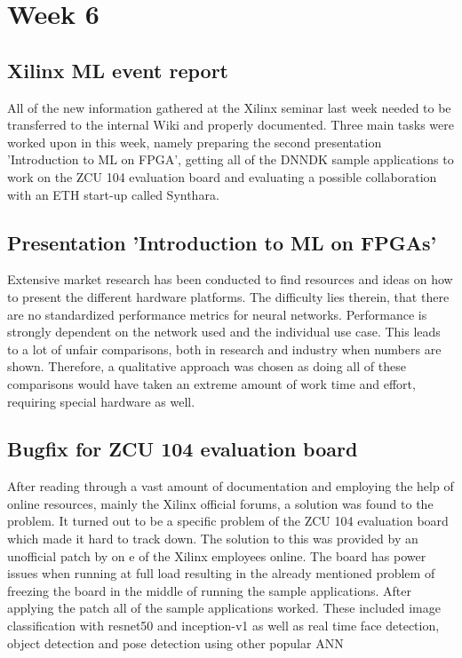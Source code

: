\section{Week 6}
\subsection{Xilinx \acs{ML} event report}
All of the new information gathered at the Xilinx seminar last week needed to be transferred to the internal Wiki and properly documented. 
Three main tasks were worked upon in this week, namely preparing the second presentation 'Introduction to \ac{ML} on \ac{FPGA}', getting all of the \ac{DNNDK} sample applications to work on the ZCU 104 evaluation board and evaluating a possible collaboration with an ETH start-up called Synthara.
\subsection{Presentation 'Introduction to \ac{ML} on \acp{FPGA}'}
Extensive market research has been conducted to find resources and ideas on how to present the different hardware platforms. The difficulty lies therein, that there are no standardized performance metrics for neural networks. Performance is strongly dependent on the network used and the individual use case. This leads to a lot of unfair comparisons, both in research and industry when numbers are shown. Therefore, a qualitative approach was chosen as doing all of these comparisons would have taken an extreme amount of work time and effort, requiring special hardware as well.
\subsection{Bugfix for ZCU 104 evaluation board}
After reading through a vast amount of documentation and employing the help of online resources, mainly the Xilinx official forums, a solution was found to the problem. It turned out to be a specific problem of the ZCU 104 evaluation board which made it hard to track down. The solution to this was provided by an unofficial patch by on e of the Xilinx employees online. The board has power issues when running at full load resulting in the already mentioned problem of freezing the board in the middle of running the sample applications. After applying the patch all of the sample applications worked. These included image classification with resnet50 and inception-v1 as well as real time face detection, object detection and pose detection using other popular \ac{ANN}
